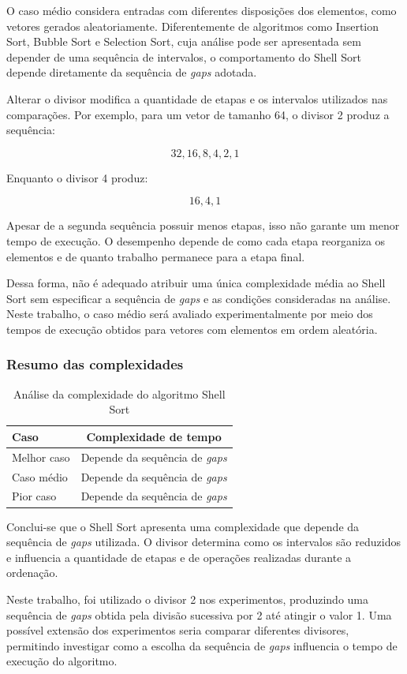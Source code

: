 O caso médio considera entradas com diferentes disposições dos elementos, como vetores gerados aleatoriamente. Diferentemente de algoritmos como Insertion Sort, Bubble Sort e Selection Sort, cuja análise pode ser apresentada sem depender de uma sequência de intervalos, o comportamento do Shell Sort depende diretamente da sequência de \textit{gaps} adotada.

Alterar o divisor modifica a quantidade de etapas e os intervalos utilizados nas comparações. Por exemplo, para um vetor de tamanho 64, o divisor 2 produz a sequência:

\begin{equation}
32,16,8,4,2,1
\end{equation}

Enquanto o divisor 4 produz:

\begin{equation}
16,4,1
\end{equation}

Apesar de a segunda sequência possuir menos etapas, isso não garante um menor tempo de execução. O desempenho depende de como cada etapa reorganiza os elementos e de quanto trabalho permanece para a etapa final.

Dessa forma, não é adequado atribuir uma única complexidade média ao Shell Sort sem especificar a sequência de \textit{gaps} e as condições consideradas na análise. Neste trabalho, o caso médio será avaliado experimentalmente por meio dos tempos de execução obtidos para vetores com elementos em ordem aleatória.

\subsubsection{Resumo das complexidades}

\begin{table}[H]
    \centering
    \caption{Análise da complexidade do algoritmo Shell Sort}
    \label{tab:complexidade-shell}
    \begin{tabular}{lc}
        \hline
        \textbf{Caso} & \textbf{Complexidade de tempo} \\
        \hline
        Melhor caso & Depende da sequência de \textit{gaps} \\
        Caso médio & Depende da sequência de \textit{gaps} \\
        Pior caso & Depende da sequência de \textit{gaps} \\
        \hline
    \end{tabular}
\end{table}

Conclui-se que o Shell Sort apresenta uma complexidade que depende da sequência de \textit{gaps} utilizada. O divisor determina como os intervalos são reduzidos e influencia a quantidade de etapas e de operações realizadas durante a ordenação.

Neste trabalho, foi utilizado o divisor 2 nos experimentos, produzindo uma sequência de \textit{gaps} obtida pela divisão sucessiva por 2 até atingir o valor 1. Uma possível extensão dos experimentos seria comparar diferentes divisores, permitindo investigar como a escolha da sequência de \textit{gaps} influencia o tempo de execução do algoritmo.